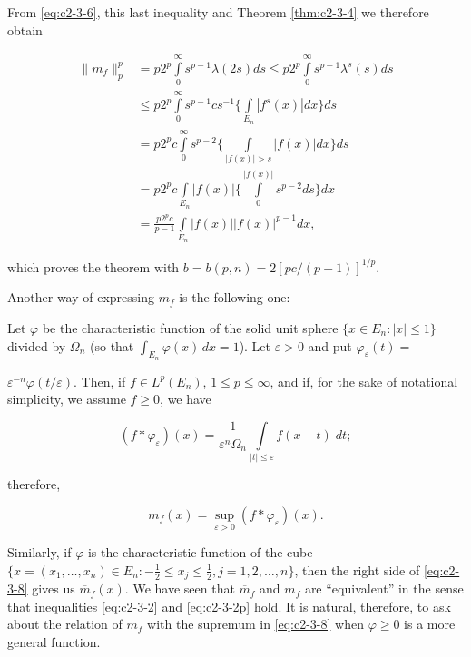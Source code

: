 From \eqref{eq:c2-3-6}, this last inequality and Theorem \ref{thm:c2-3-4} we therefore obtain

\[
\begin{aligned}\|m_{f}\|_{p}^{p}&=p2^{p}\int\limits_{0}^{\infty}s^{p-1}\lambda(2s)ds\leq p2^{p}\int\limits_{0}^{\infty}s^{p-1}\lambda^{s}(s)ds\\&\leq p2^{p}\int\limits_{0}^{\infty}s^{p-1}cs^{-1}\Biggl\{\int\limits_{E_{n}}|f^{s}(x)|dx\Biggr\}ds\\&=p2^{p}c\int\limits_{0}^{\infty}s^{p-2}\Biggl\{\int\limits_{|f(x)|>s}|f(x)|dx\Biggr\}ds\\&=p2^{p}c\int\limits_{E_{n}}|f(x)|\Biggl\{\int\limits_{0}^{|f(x)|}s^{p-2}ds\Biggr\}dx\\&=\frac{p2^{p}c}{p-1}\int\limits_{E_{n}}|f(x)||f(x)|^{p-1}dx,\end{aligned}
\]

which proves the theorem with $b = b(p, n) = 2[pc/(p - 1)]^{1/p}$.

Another way of expressing $m_{f}$ is the following one:

Let $\varphi$ be the characteristic function of the solid unit sphere $\{x \in E_n: |x| \leq 1\}$ divided by $\Omega_n$ (so that $\int_{E_n} \varphi(x) \, dx = 1$). Let $\varepsilon > 0$ and put $\varphi_\varepsilon(t) =$

$\varepsilon^{-n}\varphi(t/\varepsilon)$. Then, if $f \in L^p(E_n)$, $1 \leq p \leq \infty$, and if, for the sake of notational simplicity, we assume $f \geq 0$, we have

\[
(f*\varphi_{\varepsilon})(x)=\frac{1}{\varepsilon^{n}\Omega_{n}}\int\limits_{|t|\leq\varepsilon}f(x-t)\;d t;
\]

therefore,

\begin{equation}\label{eq:c2-3-8}
m_{f}(x)=\sup_{\varepsilon>0}(f*\varphi_{\varepsilon})(x).
\end{equation}

Similarly, if $\varphi$ is the characteristic function of the cube $\{x = (x_1, \ldots, x_n) \in E_n: -\frac{1}{2} \leq x_j \leq \frac{1}{2}, j = 1, 2, \ldots, n\}$, then the right side of \eqref{eq:c2-3-8} gives us $\overline{m}_f(x)$. We have seen that $\overline{m}_f$ and $m_f$ are ``equivalent'' in the sense that inequalities \eqref{eq:c2-3-2} and \eqref{eq:c2-3-2p} hold. It is natural, therefore, to ask about the relation of $m_f$ with the supremum in \eqref{eq:c2-3-8} when $\varphi \geq 0$ is a more general function.


